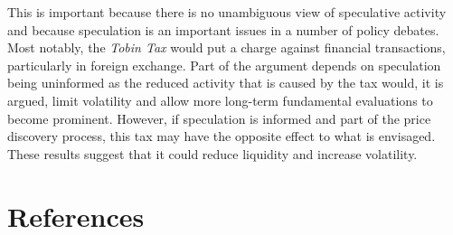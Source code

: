 \documentclass{article}
\begin{document}
This is important because there is no unambiguous view of speculative activity and because speculation is an important issues in a number of policy debates.  Most notably, the \emph{Tobin Tax} would put a charge against financial transactions, particularly in foreign exchange.  Part of the argument depends on speculation being uninformed as the reduced activity that is caused by the tax would, it is argued, limit volatility and allow more long-term fundamental evaluations to become prominent.  However, if speculation is informed and part of the price discovery process, this tax may have the opposite effect to what is envisaged.  These results suggest that it could reduce liquidity and increase volatility. 

\section*{References}

\end{document}
